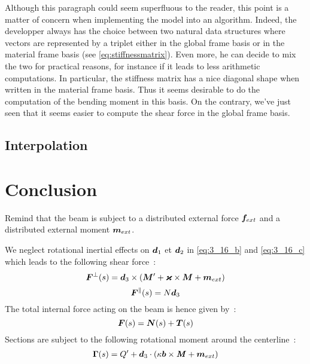 Although this paragraph could seem superfluous to the reader, this point is a matter of concern when implementing the model into an algorithm. Indeed, the developper always has the choice between two natural data structures where vectors are represented by a triplet either in the global frame basis or in the material frame basis (see \cref{eq:stiffnessmatrix}). Even more, he can decide to mix the two for practical reasons, for instance if it leads to less arithmetic computations. In particular, the stiffness matrix has a nice diagonal shape when written in the material frame basis. Thus it seems desirable to do the computation of the bending moment in this basis. On the contrary, we've just seen that it seems easier to compute the shear force in the global frame basis.

\subsection{Interpolation}


\section{Conclusion}
Remind that the beam is subject to a distributed external force $\boldsymbol{f}_{ext}$ and a distributed external moment $\boldsymbol{m}_{ext}$.

We neglect rotational inertial effects on $\boldsymbol{d}_1$ et $\boldsymbol{d}_2$ in \eqref{eq:3_16_b} and \eqref{eq:3_16_c} which leads to the following shear force~:
\begin{equation}
	\boldsymbol{F}^{\perp}(s) = \boldsymbol{d}_3 \times (\boldsymbol{M}' + \boldsymbol{\varkappa} \times \boldsymbol{M} + \boldsymbol{m}_{ext})
\end{equation}
\begin{equation}
	\boldsymbol{F}^{\parallel}(s) = N \boldsymbol{d}_3
\end{equation}
 The total internal force acting on the beam is hence given by~:
\begin{equation}
	\boldsymbol{F}(s) = \boldsymbol{N}(s) + \boldsymbol{T}(s)
\end{equation}
Sections are subject to the following rotational moment around the centerline~:
\begin{equation}
	\begin{aligned}
	\boldsymbol{\Gamma}(s) = Q' + \boldsymbol{d}_3 \cdot ( \kappa\boldsymbol{b} \times \boldsymbol{\mathit{M}} + \boldsymbol{m}_{ext})
	\end{aligned}
\end{equation}

\clearpage



\clearpage


